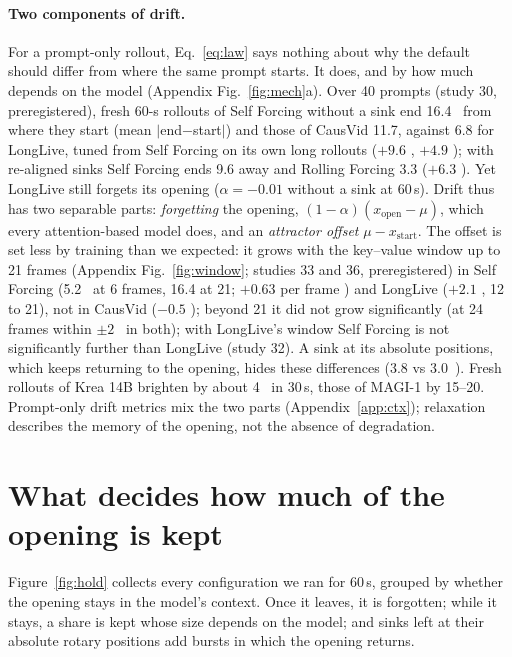 \paragraph{Two components of drift.} For a prompt-only rollout, Eq.~\ref{eq:law} says nothing about why the default
should differ from where the same prompt starts. It does, and by how much depends on the model (Appendix
Fig.~\ref{fig:mech}a). Over 40 prompts (study 30, preregistered), fresh 60-s rollouts of Self Forcing without a sink end 16.4~\Lstar{} from where they start (mean $|$end$-$start$|$) and those of CausVid 11.7,
against 6.8 for LongLive, tuned from Self Forcing on its own long rollouts ($+9.6$ , $+4.9$
); with re-aligned sinks Self Forcing ends 9.6 away and Rolling Forcing 3.3 ($+6.3$ ). Yet
LongLive still forgets its opening ($\alpha=-0.01$ without a sink at 60\,s). Drift thus has two separable parts:
\emph{forgetting} the opening, $(1-\alpha)(x_{\text{open}}-\mu)$, which every attention-based model does, and an
\emph{attractor offset} $\mu - x_{\text{start}}$. The offset is set less by training than we expected: it grows
with the key--value window up to 21 frames (Appendix Fig.~\ref{fig:window}; studies 33 and 36, preregistered) in Self Forcing (5.2~\Lstar{} at 6
frames, 16.4 at 21; $+0.63$ per frame ) and LongLive ($+2.1$ , 12 to 21), not in CausVid
($-0.5$ ); beyond 21 it did not grow significantly (at 24 frames within $\pm2$~\Lstar{} in both); with LongLive's window Self Forcing is not significantly further than LongLive (study 32). A sink at its absolute positions, which keeps returning to the opening,
hides these differences (3.8 vs 3.0~\Lstar). Fresh rollouts of Krea 14B brighten by about 4~\Lstar{} in 30\,s, those of
MAGI-1 by 15--20. Prompt-only drift metrics mix the two parts
(Appendix~\ref{app:ctx}); relaxation describes the memory of the opening, not the absence of degradation.

\section{What decides how much of the opening is kept}\label{sec:mech}
Figure~\ref{fig:hold} collects every configuration we ran for 60\,s, grouped by whether the opening stays in the
model's context. Once it leaves, it is forgotten; while it stays, a share is kept whose size depends on the model; and
sinks left at their absolute rotary positions add bursts in which the opening returns.


